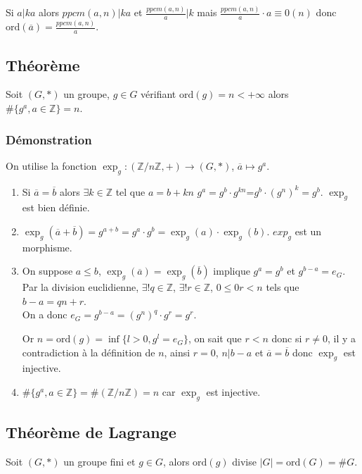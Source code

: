 \documentclass[a4paper,10pt]{book} %
\newcommand{\Z}{\mathbb{Z}}
\newcommand{\abs}[1]{\left|#1\right|}
\newcommand{\ord}{\mathrm{ord}}
\begin{document}
Si $a|ka$ alors $ppcm(a,n)|ka$ et $\frac{ppcm(a,n)}{a}|k$ mais $\frac{ppcm(a,n)}{a}\cdot a\equiv 0(n)$ donc $\ord(\overline{a})=\frac{ppcm(a,n)}{a}$.

\subsection{Théorème}\label{theoreme cardinal puissances}
Soit $(G,*)$ un groupe, $g\in G$ vérifiant $\ord(g)=n<+\infty$ alors $\#\{g^a, a\in \Z\}=n$.

\subsubsection{Démonstration}
On utilise la fonction $\exp_g : (\Z/n\Z,+)\rightarrow (G,*)$, $\overline{a}\mapsto g^a$.
\begin{enumerate}
\item Si $\overline{a}=\overline{b}$ alors $\exists k\in \Z$ tel que $a=b+kn$
$g^a=g^b\cdot g^{kn}$=$g^b\cdot (g^n)^k=g^b$. $\exp_g$ est bien définie.\smallskip

\item $\exp_g(\overline{a}+\overline{b})=g^{a+b}=g^a\cdot g^b=\exp_g(a)\cdot \exp_g(b)$. $exp_g$ est un morphisme.\smallskip

\item On suppose $a\leq b$, $\exp_g(\overline{a})=\exp_g(\overline{b})$ implique $g^a=g^b$ et $g^{b-a}=e_G$.\\
Par la division euclidienne, $\exists!q\in \Z$, $\exists!r\in \Z$, $0\leq 0r<n$ tels que $b-a=qn+r$.\\

On a donc $e_G=g^{b-a}=(g^n)^q\cdot g^r=g^r$.

Or $n=\ord(g)=\inf\{l>0, g^l=e_G\}$, on sait que $r<n$ donc si $r\neq 0$, il y a contradiction à la définition de $n$, ainsi $r=0$, $n|b-a$ et $\overline{a}=\overline{b}$ donc $\exp_g$ est injective.\smallskip

\item $\#\{g^a, a\in \Z\}=\#(\Z/n\Z)=n$ car $\exp_g$ est injective.

\end{enumerate}

\newpage

\subsection{Théorème de Lagrange}
Soit $(G,*)$ un groupe fini et $g\in G$, alors $\ord(g)$ divise $\abs{G}=\ord(G)=\# G$.
\end{document}
